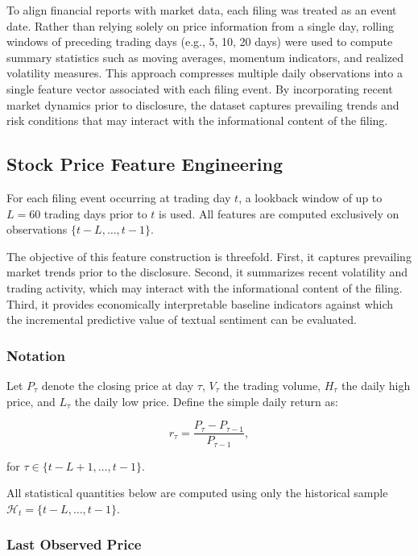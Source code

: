 To align financial reports with market data, each filing was treated as an event date. 
Rather than relying solely on price information from a single day, rolling windows of preceding trading days (e.g., 5, 10, 20 days) were used to compute summary statistics such as moving averages, momentum indicators, and realized volatility measures. 
This approach compresses multiple daily observations into a single feature vector associated with each filing event. 
By incorporating recent market dynamics prior to disclosure, the dataset captures prevailing trends and risk conditions that may interact with the informational content of the filing.

\subsection{Stock Price Feature Engineering}

For each filing event occurring at trading day $t$, a lookback window of up to $L=60$ trading days prior to $t$ is used. All features are computed exclusively on observations $\{t-L, \dots, t-1\}$.

The objective of this feature construction is threefold. First, it captures prevailing market trends prior to the disclosure. Second, it summarizes recent volatility and trading activity, which may interact with the informational content of the filing. Third, it provides economically interpretable baseline indicators against which the incremental predictive value of textual sentiment can be evaluated.

\subsubsection*{Notation}

Let $P_\tau$ denote the closing price at day $\tau$, $V_\tau$ the trading volume, $H_\tau$ the daily high price, and $L_\tau$ the daily low price. Define the simple daily return as:

\begin{equation}
r_\tau = \frac{P_\tau - P_{\tau-1}}{P_{\tau-1}},
\end{equation}

for $\tau \in \{t-L+1, \dots, t-1\}$.

All statistical quantities below are computed using only the historical sample $\mathcal{H}_t = \{t-L, \dots, t-1\}$.

\subsubsection*{Last Observed Price}

